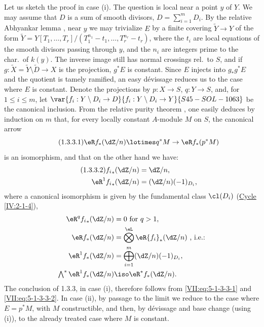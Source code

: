 Let us sketch the proof in case (i). The question is local near a point $y$
of $Y$. We may assume that $D$ is a sum of smooth divisors,
$D=\sum_{i=1}^m D_i$. By the relative Abhyankar lemma
\cite[XIII 5.5]{sga1}, near $y$ we may trivialize $E$ by a finite covering
$\widetilde Y\to Y$ of the form
$\widetilde Y=Y[T_1,\dots,T_r]/(T_1^{n_1}-t_1,\dots,T_r^{n_r}-t_r)$, where the
$t_i$ are local equations of the smooth divisors passing through $y$, and the
$n_i$ are integers prime to the char.\ of $k(y)$. The inverse image
 still has normal crossings rel.\ to $S$, and
if $g:\widetilde X=\widetilde Y\setminus \widetilde D\to X$ is the projection,
$g^\ast E$ is constant. Since $E$ injects into $g_\ast g^\ast E$ and the
quotient is tamely ramified, an easy dévissage reduces us to the case where
$E$ is constant. Denote the projections by $p:X\to S$, $q:Y\to S$, and, for
$1\leqslant i\leqslant m$, let $\var{f_i:Y\setminus D_i \to D}{f_i:Y\setminus D_i \to Y}{S45-SOL-1063}$ be the canonical
inclusion. From the relative purity theorem \cite[XVI 3.7]{sga4}, one easily
deduces by induction on $m$ that, for every locally constant $A$-module $M$ on
$S$, the canonical arrow
\begin{equation*}\tag{1.3.3.1}\label{VII:eq:5-1-3-3-1} %
  \eR f_\ast (\dZ/n)\lotimes q^\ast M\to \eR f_\ast (p^\ast M) 
\end{equation*}
is an isomorphism, and that on the other hand we have:
\begin{align*}\tag{1.3.3.2}\label{VII:eq:5-1-3-3-2}
  {f_i}_\ast(\dZ/n) &= \dZ/n \text{,} \\
  \eR^1 {f_i}_\ast (\dZ/n) &= (\dZ/n)(-1)_{D_i} \text{,} 
\end{align*}
where a canonical isomorphism is given by the fundamental class $\cl(D_i)$
(\hyperref[IV]{Cycle} \ref{IV:2-1-4}),
\begin{align*}
  \eR^q {f_i}_\ast(\dZ/n) &= 0\text{ for $q>1$,} \\
  \eR f_\ast (\dZ/n) &= \bigotimes^\eL \eR {f_i}_\ast (\dZ/n) \text{ , i.e.:} \\
  \eR^1 f_\ast(\dZ/n) &= \bigoplus_{i=1}^m (\dZ/n)(-1)_{D_i} \text{,} \\
  \textstyle\bigwedge^\ast \eR^1 f_\ast(\dZ/n) &\iso \eR^\ast f_\ast (\dZ/n) \text{.} 
\end{align*}
The conclusion of 1.3.3, in case (i), therefore follows from
\eqref{VII:eq:5-1-3-3-1} and \eqref{VII:eq:5-1-3-3-2}. In case (ii), by
passage to the limit we reduce to the case where $E=p^\ast M$, with $M$
constructible, and then, by dévissage and base change (using (i)), to the
already treated case where $M$ is constant.

